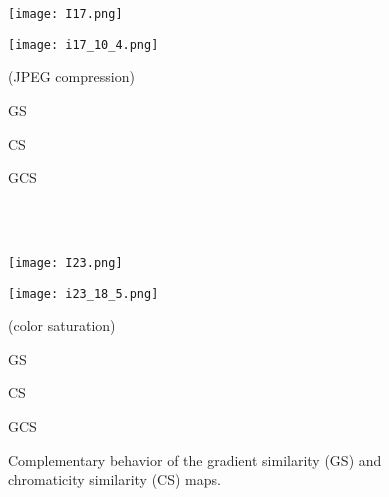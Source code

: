 \begin{figure*}[htb]
\scriptsize
\begin{minipage}[b]{0.197\linewidth}
  \centering
  \centerline{\texttt{[image: I17.png]}} 
  \vspace{0.10cm}
\centerline{}
\end{minipage}
\begin{minipage}[b]{0.19\linewidth}
  \centering
  \centerline{\texttt{[image: i17\_10\_4.png]}}
  \vspace{0.10cm}
\centerline{ (JPEG compression)}
\end{minipage}
\begin{minipage}[b]{0.19\linewidth}
  \centering
  \centerline{}
\vspace{0.10cm}
\centerline{GS}
\end{minipage}
\begin{minipage}[b]{0.19\linewidth}
  \centering
  \centerline{}
\vspace{0.10cm}
\centerline{CS}
\end{minipage}
\begin{minipage}[b]{.19\linewidth}
  \centering
  \centerline{}
\vspace{0.10cm}
\centerline{GCS}
\end{minipage}
\\ \\
\begin{minipage}[b]{0.19\linewidth}
  \centering
  \centerline{\texttt{[image: I23.png]}} 
  \vspace{0.10cm}
\centerline{}
\end{minipage}
\begin{minipage}[b]{0.19\linewidth}
  \centering
  \centerline{\texttt{[image: i23\_18\_5.png]}}
  \vspace{0.10cm}
\centerline{ (color saturation)}
\end{minipage}
\begin{minipage}[b]{0.19\linewidth}
  \centering
  \centerline{}
\vspace{0.10cm}
\centerline{GS}
\end{minipage}
\begin{minipage}[b]{0.19\linewidth}
  \centering
  \centerline{}
\vspace{0.10cm}
\centerline{CS}
\end{minipage}
\begin{minipage}[b]{.19\linewidth}
  \centering
  \centerline{}
\vspace{0.10cm}
\centerline{GCS}
\end{minipage}
\caption{Complementary behavior of the gradient similarity (GS) and chromaticity similarity (CS) maps.}
\label{fig:out1}
\end{figure*}


